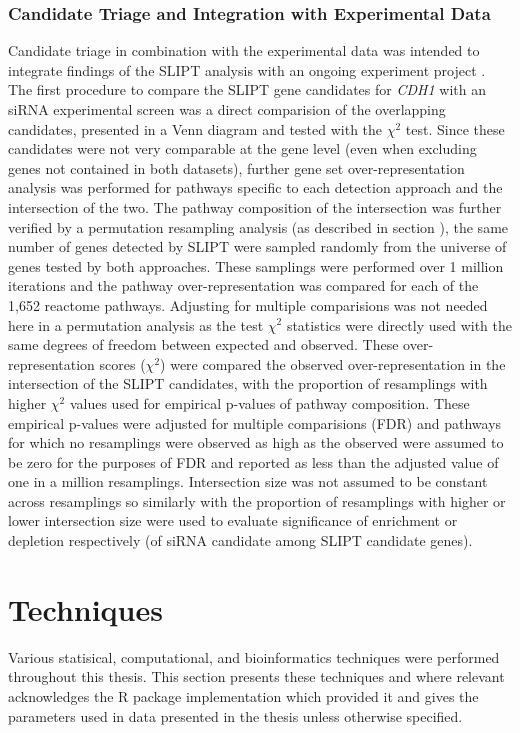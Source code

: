 \subsubsection{Candidate Triage and Integration with Experimental Data} \label{methods:venn_analysis}
Candidate triage in combination with the experimental data was intended to integrate findings of the SLIPT analysis with an ongoing experiment project \cite{Chen2014, Telford2015}. The first procedure to compare the SLIPT gene candidates for \textit{CDH1} with an siRNA experimental screen \cite{Telford2015} was a direct comparision of the overlapping candidates, presented in a Venn diagram and tested with the $\chi^2$ test. Since these candidates were not very comparable at the gene level (even when excluding genes not contained in both datasets), further gene set over-representation analysis was performed for pathways specific to each detection approach and the intersection of the two. The pathway composition of the intersection was further verified by a permutation resampling analysis (as described in section \label{methods:permutation}), the same number of genes detected by SLIPT were sampled randomly from the universe of genes tested by both approaches. These samplings were performed over 1 million iterations and the pathway over-representation was compared for each of the 1,652 reactome pathways. Adjusting for multiple comparisions was not needed here in a permutation analysis as the test $\chi^2$ statistics were directly used with the same degrees of freedom between expected and observed. These over-representation scores ($\chi^2$) were compared the observed over-representation in the intersection of the SLIPT candidates, with the proportion of resamplings with higher $\chi^2$ values used for empirical p-values of pathway composition. These empirical p-values were adjusted for multiple comparisions (FDR) and pathways for which no resamplings were observed as high as the observed were assumed to be zero for the purposes of FDR and reported as less than the adjusted value of one in a million resamplings. Intersection size was not assumed to be constant across resamplings so similarly with the proportion of resamplings with higher or lower intersection size were used to evaluate significance of enrichment or depletion respectively (of siRNA candidate among SLIPT candidate genes).  

\section{Techniques}
Various statisical, computational, and bioinformatics techniques were performed throughout this thesis. This section presents these techniques and where relevant acknowledges the R package implementation which provided it and gives the parameters used in data presented in the thesis unless otherwise specified.

